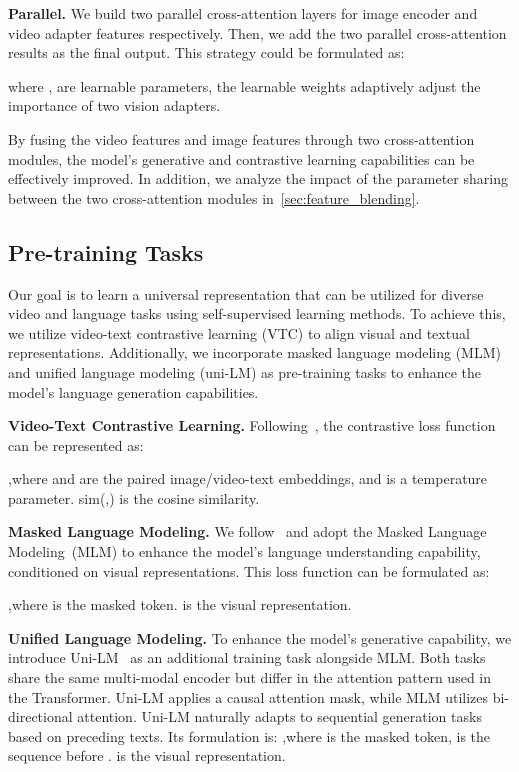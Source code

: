 \documentclass{article}
\begin{document}
\textbf{Parallel.} We build two parallel cross-attention layers for image encoder and video adapter features respectively. Then, we add the two parallel cross-attention results as the final output. This strategy could be formulated as:

where ,  are learnable parameters, the learnable weights adaptively adjust the importance of two vision adapters.

By fusing the video features and image features through two cross-attention modules, the model's generative and contrastive learning capabilities can be effectively improved. In addition, we analyze the impact of the parameter sharing between the two cross-attention modules in~\cref{sec:feature_blending}.

\subsection{Pre-training Tasks}
\label{sec:pre-training-tasks}

Our goal is to learn a universal representation that can be utilized for diverse video and language tasks using self-supervised learning methods. To achieve this, we utilize video-text contrastive learning (VTC) to align visual and textual representations. Additionally, we incorporate masked language modeling (MLM) and unified language modeling (uni-LM) as pre-training tasks to enhance the model's language generation capabilities.
 
\noindent\textbf{Video-Text Contrastive Learning.}
Following~\cite{li2022blip,yu2022coca}, the contrastive loss function can be represented as: 

,where  and  are the paired image/video-text embeddings, and  is a temperature parameter. sim(,) is the cosine similarity.

\noindent\textbf{Masked Language Modeling.} We follow~\cite{kenton2019bert} and adopt the Masked Language Modeling~(MLM) to enhance the model's language understanding capability, conditioned on visual representations. This loss function can be formulated as: 

,where  is the masked token.  is the visual representation.

\noindent\textbf{Unified Language Modeling.} 
To enhance the model's generative capability, we introduce Uni-LM~\cite{dong2019unified} as an additional training task alongside MLM. Both tasks share the same multi-modal encoder but differ in the attention pattern used in the Transformer. Uni-LM applies a causal attention mask, while MLM utilizes bi-directional attention. Uni-LM naturally adapts to sequential generation tasks based on preceding texts. Its formulation is: 
,where  is the masked token,  is the sequence before .  is the visual representation.
\end{document}
